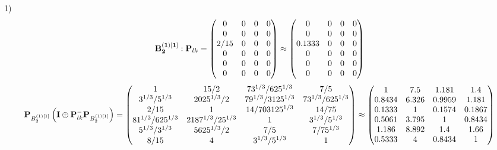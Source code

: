 \documentclass[10pt,a4paper]{article}
\begin{document}
	1)
	\[
		\bold{B_2^{(1)[1]}}: \bold{P}_{lk} = 
		\begin{pmatrix}
			{{0}}{} & {{0}}{} & {{0}}{} & {{0}}{} \\
			{{0}}{} & {{0}}{} & {{0}}{} & {{0}}{} \\
			{{2}} / {{15}} & {{0}}{} & {{0}}{} & {{0}}{} \\
			{{0}}{} & {{0}}{} & {{0}}{} & {{0}}{} \\
			{{0}}{} & {{0}}{} & {{0}}{} & {{0}}{} \\
			{{0}}{} & {{0}}{} & {{0}}{} & {{0}}{} \\
		\end{pmatrix}
		\approx
		\begin{pmatrix}
			0        & 0        & 0        & 0        \\
			0        & 0        & 0        & 0        \\
			0.1333   & 0        & 0        & 0        \\
			0        & 0        & 0        & 0        \\
			0        & 0        & 0        & 0        \\
			0        & 0        & 0        & 0        \\
		\end{pmatrix}
	\]
	\[
		\bold{P}_{B_2^{(1)[1]}}\left(\bold{I} \oplus \bold{P}_{lk}^{-}\bold{P}_{B_2^{(1)[1]}}\right) = 
		\begin{pmatrix}
			{1}{} & {{15}} / {{2}} & {{7}{3^ {1 / 3}}} / {{625^ {1 / 3}}} & {{7}} / {{5}} \\
			{{3^ {1 / 3}}} / {{5^ {1 / 3}}} & {{2025^ {1 / 3}}} / {{2}} & {{7}{9^ {1 / 3}}} / {{3125^ {1 / 3}}} & {{7}{3^ {1 / 3}}} / {{625^ {1 / 3}}} \\
			{{2}} / {{15}} & {1}{} & {{14}} / {{703125^ {1 / 3}}} & {{14}} / {{75}} \\
			{{81^ {1 / 3}}} / {{625^ {1 / 3}}} & {{2187^ {1 / 3}}} / {{2}{5^ {1 / 3}}} & {1}{} & {{3^ {1 / 3}}} / {{5^ {1 / 3}}} \\
			{{5^ {1 / 3}}} / {{3^ {1 / 3}}} & {{5625^ {1 / 3}}} / {{2}} & {{7}} / {{5}} & {{7}} / {{75^ {1 / 3}}} \\
			{{8}} / {{15}} & {{4}}{} & {{3^ {1 / 3}}} / {{5^ {1 / 3}}} & {1}{} \\
		\end{pmatrix}
		\approx
		\begin{pmatrix}
			1        & 7.5      & 1.181    & 1.4      \\
			0.8434   & 6.326    & 0.9959   & 1.181    \\
			0.1333   & 1        & 0.1574   & 0.1867   \\
			0.5061   & 3.795    & 1        & 0.8434   \\
			1.186    & 8.892    & 1.4      & 1.66     \\
			0.5333   & 4        & 0.8434   & 1        \\
		\end{pmatrix}
	\]
\end{document}
